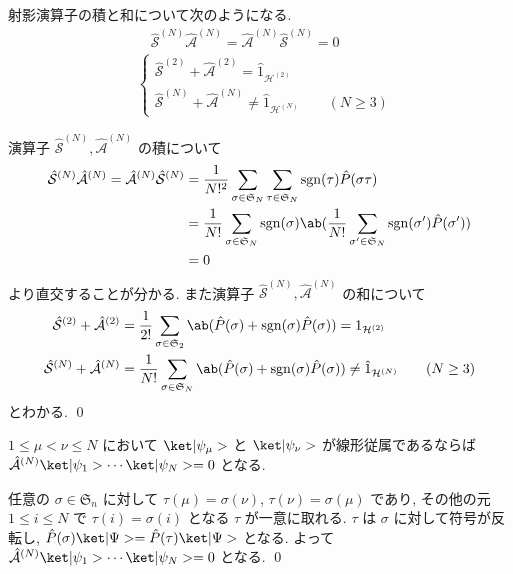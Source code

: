 \documentclass[uplatex,dvipdfmx,a4paper,11pt]{jlreq}
\makeatletter
\DeclareMathOperator{\sgn}{sgn}
\newcommand{\HH}{\mathcal{H}}
\renewcommand{\SS}{\mathfrak{S}}
\renewcommand{\S}{\mathcal{S}}
\newcommand{\A}{\mathcal{A}}
\numberwithin{equation}{section}
\theoremstyle{definition}
\renewenvironment{proof}[1][\proofname]{\par
  \normalfont
  \topsep6\p@\@plus6\p@ \trivlist
  \item[\hskip\labelsep{\bfseries #1}\@addpunct{\bfseries}]\ignorespaces\quad\par
}{%
  \qed\endtrivlist\@endpefalse
}
\renewcommand\proofname{証明}
\makeatother
\begin{document}
\begin{proposition}[Q21-14(iv)(v)]
  射影演算子の積と和について次のようになる.
  \begin{align}
     & \quad \hat{\S}^{(N)}\hat{\A}^{(N)} = \hat{\A}^{(N)}\hat{\S}^{(N)} = 0     \\
     & \begin{cases}
         \hat{\S}^{(2)} + \hat{\A}^{(2)} = \hat{1}_{\HH^{(2)}} \\
         \hat{\S}^{(N)} + \hat{\A}^{(N)} \neq \hat{1}_{\HH^{(N)}} \qquad (N \geq 3)
       \end{cases}
  \end{align}
\end{proposition}
\begin{proof}
  演算子 $\hat{\S}^{(N)}, \hat{\A}^{(N)}$ の積について
  \begin{align}
    \hat{\S}^{(N)}\hat{\A}^{(N)} = \hat{\A}^{(N)}\hat{\S}^{(N)} & = \frac{1}{N!^2}\sum_{\sigma\in\SS_N}\sum_{\tau\in\SS_N}\sgn(\tau)\hat{P}(\sigma\tau)                               \\
                                                                & = \frac{1}{N!}\sum_{\sigma\in\SS_N}\sgn(\sigma)\ab(\frac{1}{N!}\sum_{\sigma'\in\SS_N}\sgn(\sigma')\hat{P}(\sigma')) \\
                                                                & = 0
  \end{align}
  より直交することが分かる. また演算子 $\hat{\S}^{(N)}, \hat{\A}^{(N)}$ の和について
  \begin{align}
    \hat{\S}^{(2)} + \hat{\A}^{(2)} & = \frac{1}{2!}\sum_{\sigma\in\SS_2}\ab(\hat{P}(\sigma) + \sgn(\sigma)\hat{P}(\sigma)) = 1_{\HH^{(2)}}                            \\
    \hat{\S}^{(N)} + \hat{\A}^{(N)} & = \frac{1}{N!}\sum_{\sigma\in\SS_N}\ab(\hat{P}(\sigma) + \sgn(\sigma)\hat{P}(\sigma)) \neq \hat{1}_{\HH^{(N)}} \qquad (N \geq 3)
  \end{align}
  とわかる.
\end{proof}

\begin{theorem}[Q21-15]
  $1\leq\mu<\nu\leq N$ において $\ket|\psi_\mu>$ と $\ket|\psi_\nu>$ が線形従属であるならば $\hat{\A}^{(N)}\ket|\psi_1>\cdots\ket|\psi_N> = 0$ となる.
\end{theorem}
\begin{proof}
  任意の $\sigma\in\SS_n$ に対して $\tau(\mu) = \sigma(\nu)$, $\tau(\nu) = \sigma(\mu)$ であり, その他の元 $1\leq i\leq N$ で $\tau(i) = \sigma(i)$ となる $\tau$ が一意に取れる. $\tau$ は $\sigma$ に対して符号が反転し, $\hat{P}(\sigma)\ket|\Psi> = \hat{P}(\tau)\ket|\Psi>$ となる. よって $\hat{\A}^{(N)}\ket|\psi_1>\cdots\ket|\psi_N> = 0$ となる.
\end{proof}
\end{document}
